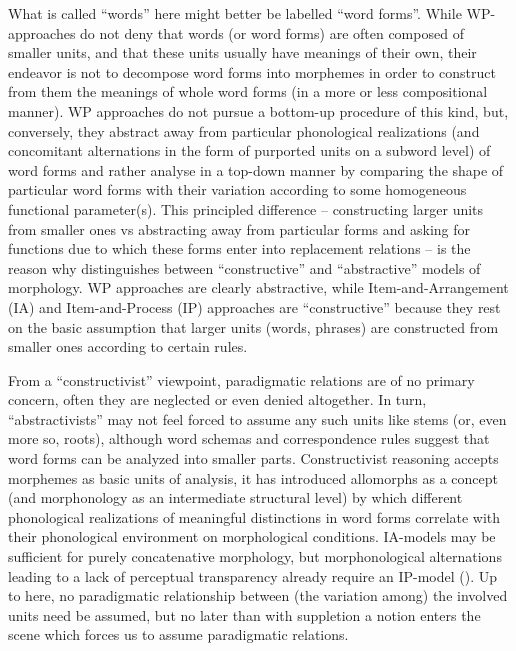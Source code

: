 \documentclass[output=paper]{langscibook}
\begin{document}
What is called “words” here might better be labelled ``word forms''. While WP-approaches do not deny that words (or word forms) are often composed of smaller units, and that these units usually have meanings of their own, their endeavor is not to decompose word forms into morphemes in order to construct from them the meanings of whole word forms (in a more or less compositional manner). WP approaches do not pursue a bottom-up procedure of this kind, but, conversely, they abstract away from particular phonological realizations (and concomitant alternations in the form of purported units on a subword level) of word forms and rather analyse in a top-down manner by comparing the shape of particular word forms with their variation according to some homogeneous functional parameter(s). This principled difference – constructing larger units from smaller ones vs abstracting away from particular forms and asking for functions due to which these forms enter into replacement relations – is the reason why \citet{Blevins2016} distinguishes between ``constructive'' and ``abstractive'' models of morphology. WP approaches are clearly abstractive, while Item-and-Arrangement (IA) and Item-and-Process (IP) approaches are ``constructive'' because they rest on the basic assumption that larger units (words, phrases) are constructed from smaller ones according to certain rules.

From a ``constructivist'' viewpoint, paradigmatic relations are of no primary concern, often they are neglected or even denied altogether. In turn, ``abstractivists'' may not feel forced to assume any such units like stems (or, even more so, roots), although word schemas and correspondence rules suggest that word forms can be analyzed into smaller parts. Constructivist reasoning accepts morphemes as basic units of analysis, it has introduced allomorphs as a concept (and morphonology as an intermediate structural level) by which different phonological realizations of meaningful distinctions in word forms correlate with their phonological environment on morphological conditions. IA-models may be sufficient for purely concatenative morphology, but morphonological alternations leading to a lack of perceptual transparency already require an IP-model (\citealt[72--73]{Plungjan2000}). Up to here, no paradigmatic relationship between (the variation among) the involved units need be assumed, but no later than with suppletion a notion enters the scene which forces us to assume paradigmatic relations.
\end{document}
